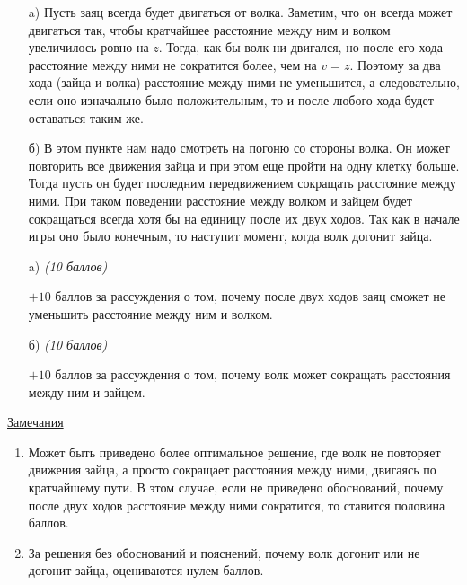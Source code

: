 \solutionSection
\begin{enumerate}

    \item[a)] Пусть заяц всегда будет двигаться от волка. Заметим, что он всегда может двигаться так, чтобы кратчайшее расстояние между ним и волком увеличилось ровно на $z$. Тогда, как бы волк ни двигался, но после его хода расстояние между ними не сократится более, чем на $v = z$. Поэтому за два хода (зайца и волка) расстояние между ними не уменьшится, а следовательно, если оно изначально было положительным, то и после любого хода будет оставаться таким же.
	
    \item[б)] В этом пункте нам надо смотреть на погоню со стороны волка. Он может повторить все движения зайца и при этом еще пройти на одну клетку больше. Тогда пусть он будет последним передвижением сокращать расстояние между ними. При таком поведении расстояние между волком и зайцем будет сокращаться всегда хотя бы на единицу после их двух ходов. Так как в начале игры оно было конечным, то наступит момент, когда волк догонит зайца.
    
\end{enumerate}

\additionalCriteria

\begin{enumerate}

    \item[a)] \textit{(10 баллов)}
	
	$+10$ баллов за рассуждения о том, почему после двух ходов
	заяц сможет не уменьшить расстояние между ним и волком.

	\item[б)] \textit{(10 баллов)}

	$+10$ баллов за рассуждения о том, почему волк может
	сокращать расстояния между ним и зайцем.
\end{enumerate}

	\underline{Замечания}
\begin{enumerate}
	\item Может быть приведено более оптимальное решение, где
	волк не повторяет движения зайца, а просто сокращает расстояния
	между ними, двигаясь по кратчайшему пути. В этом случае, если
	не приведено обоснований, почему после двух ходов расстояние между
	ними сократится, то ставится половина баллов.
	
	\item За решения без обоснований и пояснений, почему волк
	догонит или не догонит зайца, оцениваются нулем баллов.
\end{enumerate}	